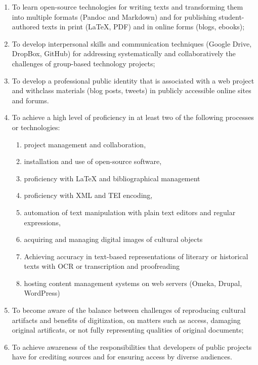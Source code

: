 \documentclass[]{article}
\begin{document}
\begin{enumerate}
\def\labelenumi{\arabic{enumi}.}
\itemsep1pt\parskip0pt
\item
  To learn open-source technologies for writing texts and transforming
  them into multiple formats (Pandoc and Markdown) and for publishing
  student-authored texts in print (LaTeX, PDF) and in online forms
  (blogs, ebooks);
\item
  To develop interpersonal skills and communication techniques (Google
  Drive, DropBox, GitHub) for addressing systematically and
  collaboratively the challenges of group-based technology projects;
\item
  To develop a professional public identity that is associated with a
  web project and withclass materials (blog posts, tweets) in publicly
  accessible online sites and forums.
\item
  To achieve a high level of proficiency in at least two of the
  following processes or technologies:

  \begin{enumerate}
  \def\labelenumii{\Alph{enumii})}
  \itemsep1pt\parskip0pt
  \item
    project management and collaboration,
  \item
    installation and use of open-source software,
  \item
    proficiency with LaTeX and bibliographical management
  \item
    proficiency with XML and TEI encoding,
  \item
    automation of text manipulation with plain text editors and regular
    expressions,
  \item
    acquiring and managing digital images of cultural objects
  \item
    Achieving accuracy in text-based representations of literary or
    historical texts with OCR or transcription and proofreading
  \item
    hosting content management systems on web servers (Omeka, Drupal,
    WordPress)
  \end{enumerate}
\item
  To become aware of the balance between challenges of reproducing
  cultural artifacts and benefits of digitization, on matters such as
  access, damaging original artificats, or not fully representing
  qualities of original documents;
\item
  To achieve awareness of the responsibilities that developers of public
  projects have for crediting sources and for ensuring access by diverse
  audiences.
\end{enumerate}
\end{document}
